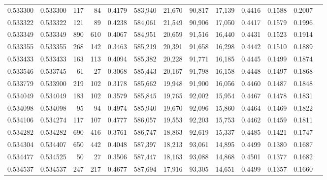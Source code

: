 \begin{tabular}{rrrrrrrrrrrrr}
0.533300 & 0.533300 &   117 &    84 &                                     0.4179 & 583,940 &  21,670 &  90,817 &  17,139 & 0.4416 & 0.1588 & 0.2007 \\
0.533322 & 0.533322 &   121 &    89 &                                     0.4238 & 584,061 &  21,549 &  90,906 &  17,050 & 0.4417 & 0.1579 & 0.1996 \\
0.533349 & 0.533349 &   890 &   610 &                                     0.4067 & 584,951 &  20,659 &  91,516 &  16,440 & 0.4431 & 0.1523 & 0.1914 \\
0.533355 & 0.533355 &   268 &   142 &                                     0.3463 & 585,219 &  20,391 &  91,658 &  16,298 & 0.4442 & 0.1510 & 0.1889 \\
0.533433 & 0.533433 &   163 &   113 &                                     0.4094 & 585,382 &  20,228 &  91,771 &  16,185 & 0.4445 & 0.1499 & 0.1874 \\
0.533546 & 0.533745 &    61 &    27 &                                     0.3068 & 585,443 &  20,167 &  91,798 &  16,158 & 0.4448 & 0.1497 & 0.1868 \\
0.533779 & 0.533900 &   219 &   102 &                                     0.3178 & 585,662 &  19,948 &  91,900 &  16,056 & 0.4460 & 0.1487 & 0.1848 \\
0.534049 & 0.534049 &   183 &   102 &                                     0.3579 & 585,845 &  19,765 &  92,002 &  15,954 & 0.4467 & 0.1478 & 0.1831 \\
0.534098 & 0.534098 &    95 &    94 &                                     0.4974 & 585,940 &  19,670 &  92,096 &  15,860 & 0.4464 & 0.1469 & 0.1822 \\
0.534106 & 0.534274 &   117 &   107 &                                     0.4777 & 586,057 &  19,553 &  92,203 &  15,753 & 0.4462 & 0.1459 & 0.1811 \\
0.534282 & 0.534282 &   690 &   416 &                                     0.3761 & 586,747 &  18,863 &  92,619 &  15,337 & 0.4485 & 0.1421 & 0.1747 \\
0.534304 & 0.534407 &   650 &   442 &                                     0.4048 & 587,397 &  18,213 &  93,061 &  14,895 & 0.4499 & 0.1380 & 0.1687 \\
0.534477 & 0.534525 &    50 &    27 &                                     0.3506 & 587,447 &  18,163 &  93,088 &  14,868 & 0.4501 & 0.1377 & 0.1682 \\
0.534537 & 0.534537 &   247 &   217 &                                     0.4677 & 587,694 &  17,916 &  93,305 &  14,651 & 0.4499 & 0.1357 & 0.1660 \\

\end{tabular}
